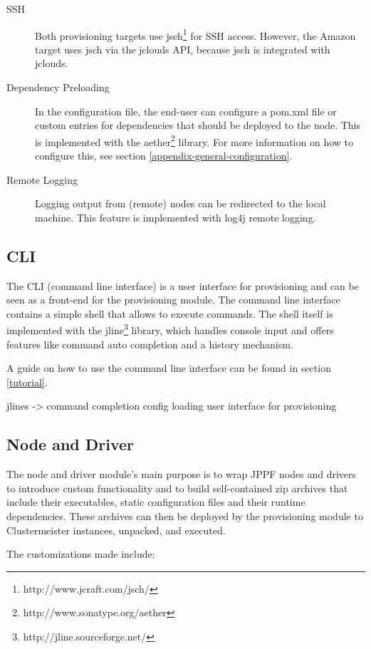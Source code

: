 \documentclass[12pt]{article}
\begin{document}
\begin{description}
 \item[SSH] Both provisioning targets use jsch\footnote{http://www.jcraft.com/jsch/} for SSH access. However, the Amazon target uses jsch via the jclouds API, because jsch is integrated with jclouds.
 \item[Dependency Preloading] In the configuration file, the end-user can configure a pom.xml file or custom entries for dependencies that should be deployed to the node. This is implemented with the aether\footnote{http://www.sonatype.org/aether} library. For more information on how to configure this, see section \ref{appendix-general-configuration}.
 \item[Remote Logging] Logging output from (remote) nodes can be redirected to the local machine. This feature is implemented with log4j remote logging.
\end{description}


\subsection{CLI}

The CLI (command line interface) is a user interface for provisioning and can be seen as a front-end for the provisioning module. The command line interface contains a simple shell that allows to execute commands. The shell itself is implemented with the jline\footnote{http://jline.sourceforge.net/} library, which handles console input and offers features like command auto completion and a history mechanism.

A guide on how to use the command line interface can be found in section \ref{tutorial}.

jlines -> command completion
config loading
user interface for provisioning

\subsection{Node and Driver}
The node and driver module's main purpose is to wrap JPPF nodes and drivers to introduce custom functionality and to build self-contained zip archives that include their executables, static configuration files and their runtime dependencies. These archives can then be deployed by the provisioning module to Clustermeister instances, unpacked, and executed.

The customizations made include:
\end{document}

